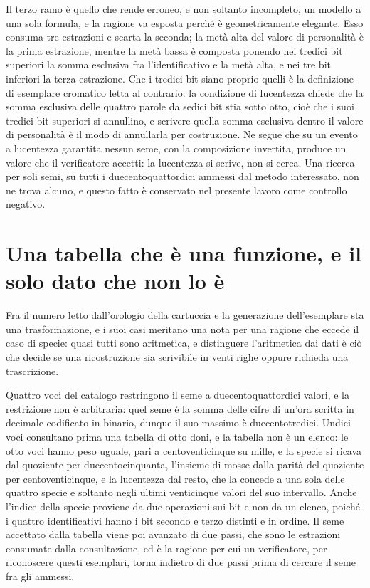Il terzo ramo è quello che rende erroneo, e non soltanto incompleto, un modello a una sola formula, e la ragione va esposta perché è geometricamente elegante. Esso consuma tre estrazioni e scarta la seconda; la metà alta del valore di personalità è la prima estrazione, mentre la metà bassa è composta ponendo nei tredici bit superiori la somma esclusiva fra l'identificativo e la metà alta, e nei tre bit inferiori la terza estrazione. Che i tredici bit siano proprio quelli è la definizione di esemplare cromatico letta al contrario: la condizione di lucentezza chiede che la somma esclusiva delle quattro parole da sedici bit stia sotto otto, cioè che i suoi tredici bit superiori si annullino, e scrivere quella somma esclusiva dentro il valore di personalità è il modo di annullarla per costruzione. Ne segue che su un evento a lucentezza garantita nessun seme, con la composizione invertita, produce un valore che il verificatore accetti: la lucentezza si scrive, non si cerca. Una ricerca per soli semi, su tutti i duecentoquattordici ammessi dal metodo interessato, non ne trova alcuno, e questo fatto è conservato nel presente lavoro come controllo negativo.

\section{Una tabella che è una funzione, e il solo dato che non lo è}

Fra il numero letto dall'orologio della cartuccia e la generazione dell'esemplare sta una trasformazione, e i suoi casi meritano una nota per una ragione che eccede il caso di specie: quasi tutti sono aritmetica, e distinguere l'aritmetica dai dati è ciò che decide se una ricostruzione sia scrivibile in venti righe oppure richieda una trascrizione.

Quattro voci del catalogo restringono il seme a duecentoquattordici valori, e la restrizione non è arbitraria: quel seme è la somma delle cifre di un'ora scritta in decimale codificato in binario, dunque il suo massimo è duecentotredici. Undici voci consultano prima una tabella di otto doni, e la tabella non è un elenco: le otto voci hanno peso uguale, pari a centoventicinque su mille, e la specie si ricava dal quoziente per duecentocinquanta, l'insieme di mosse dalla parità del quoziente per centoventicinque, e la lucentezza dal resto, che la concede a una sola delle quattro specie e soltanto negli ultimi venticinque valori del suo intervallo. Anche l'indice della specie proviene da due operazioni sui bit e non da un elenco, poiché i quattro identificativi hanno i bit secondo e terzo distinti e in ordine. Il seme accettato dalla tabella viene poi avanzato di due passi, che sono le estrazioni consumate dalla consultazione, ed è la ragione per cui un verificatore, per riconoscere questi esemplari, torna indietro di due passi prima di cercare il seme fra gli ammessi.

